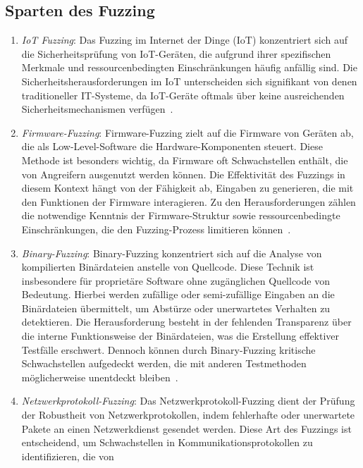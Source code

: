 \subsection{Sparten des Fuzzing}\label{subsec:sparten-des-fuzzing}
\begin{enumerate}
    \item \textit{IoT Fuzzing}: Das Fuzzing im Internet der Dinge (IoT) konzentriert sich auf die Sicherheitsprüfung von IoT-Geräten, die aufgrund ihrer
    spezifischen Merkmale und ressourcenbedingten Einschränkungen häufig anfällig sind.
    Die Sicherheitsherausforderungen im IoT unterscheiden sich signifikant von denen traditioneller IT-Systeme, da IoT-Geräte
    oftmals über keine ausreichenden Sicherheitsmechanismen verfügen~\cite{eceiza_fuzzing_2021}.
    \item \textit{Firmware-Fuzzing}: Firmware-Fuzzing zielt auf die Firmware von Geräten ab, die als Low-Level-Software die Hardware-Komponenten steuert.
    Diese Methode ist besonders wichtig, da Firmware oft Schwachstellen enthält, die von Angreifern ausgenutzt werden können.
    Die Effektivität des Fuzzings in diesem Kontext hängt von der Fähigkeit ab, Eingaben zu generieren, die mit den Funktionen
    der Firmware interagieren.
    Zu den Herausforderungen zählen die notwendige Kenntnis der Firmware-Struktur sowie ressourcenbedingte Einschränkungen,
    die den Fuzzing-Prozess limitieren können~\cite{eceiza_fuzzing_2021}.
    \item \textit{Binary-Fuzzing}: Binary-Fuzzing konzentriert sich auf die Analyse von kompilierten Binärdateien anstelle von Quellcode.
    Diese Technik ist insbesondere für proprietäre Software ohne zugänglichen Quellcode von Bedeutung.
    Hierbei werden zufällige oder semi-zufällige Eingaben an die Binärdateien übermittelt, um Abstürze oder unerwartetes Verhalten
    zu detektieren.
    Die Herausforderung besteht in der fehlenden Transparenz über die interne Funktionsweise der Binärdateien, was die Erstellung
    effektiver Testfälle erschwert.
    Dennoch können durch Binary-Fuzzing kritische Schwachstellen aufgedeckt werden, die mit anderen Testmethoden möglicherweise
    unentdeckt bleiben~\cite{eceiza_fuzzing_2021}.
    \item \textit{Netzwerkprotokoll-Fuzzing}: Das Netzwerkprotokoll-Fuzzing dient der Prüfung der Robustheit von Netzwerkprotokollen, indem fehlerhafte oder unerwartete
    Pakete an einen Netzwerkdienst gesendet werden.
    Diese Art des Fuzzings ist entscheidend, um Schwachstellen in Kommunikationsprotokollen zu identifizieren, die von

\end{enumerate}
